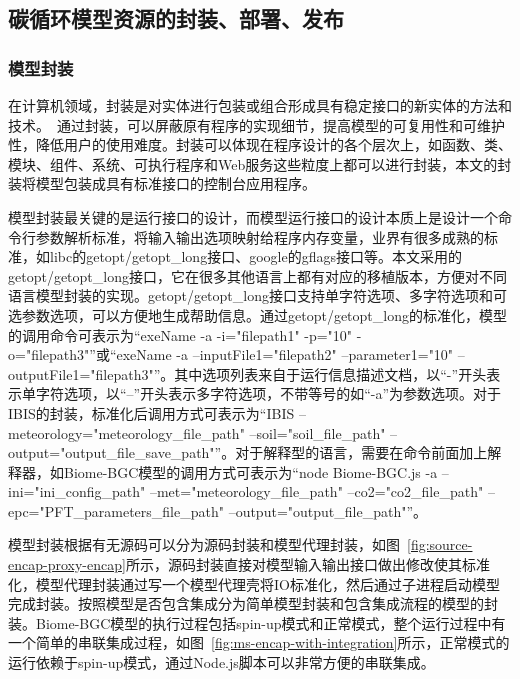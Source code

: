 \subsection{碳循环模型资源的封装、部署、发布}
\label{subsec:ms-encap}
\subsubsection{模型封装}

在计算机领域，封装是对实体进行包装或组合形成具有稳定接口的新实体的方法和技术。~\cite{胡迪2015地理模型的服务化封装方法研究}通过封装，可以屏蔽原有程序的实现细节，提高模型的可复用性和可维护性，降低用户的使用难度。封装可以体现在程序设计的各个层次上，如函数、类、模块、组件、系统、可执行程序和Web服务这些粒度上都可以进行封装，本文的封装将模型包装成具有标准接口的控制台应用程序。

模型封装最关键的是运行接口的设计，而模型运行接口的设计本质上是设计一个命令行参数解析标准，将输入输出选项映射给程序内存变量，业界有很多成熟的标准，如libc的getopt/getopt\_long接口、google的gflags接口等。本文采用的getopt/getopt\_long接口，它在很多其他语言上都有对应的移植版本，方便对不同语言模型封装的实现。getopt/getopt\_long接口支持单字符选项、多字符选项和可选参数选项，可以方便地生成帮助信息。通过getopt/getopt\_long的标准化，模型的调用命令可表示为“exeName -a -i="filepath1" -p="10" -o="filepath3"”或“exeName -a --inputFile1="filepath2" --parameter1="10" --outputFile1="filepath3"”。其中选项列表来自于运行信息描述文档，以“-”开头表示单字符选项，以“--”开头表示多字符选项，不带等号的如“-a”为参数选项。对于IBIS的封装，标准化后调用方式可表示为“IBIS --meteorology="meteorology\_file\_path" --soil="soil\_file\_path" --output="output\_file\_save\_path"”。对于解释型的语言，需要在命令前面加上解释器，如Biome-BGC模型的调用方式可表示为“node Biome-BGC.js -a --ini="ini\_config\_path" --met="meteorology\_file\_path" --co2="co2\_file\_path" --epc="PFT\_parameters\_file\_path" --output="output\_file\_path"”。

模型封装根据有无源码可以分为源码封装和模型代理封装，如图~\ref{fig:source-encap-proxy-encap}所示，源码封装直接对模型输入输出接口做出修改使其标准化，模型代理封装通过写一个模型代理壳将IO标准化，然后通过子进程启动模型完成封装。按照模型是否包含集成分为简单模型封装和包含集成流程的模型的封装。Biome-BGC模型的执行过程包括spin-up模式和正常模式，整个运行过程中有一个简单的串联集成过程，如图~\ref{fig:ms-encap-with-integration}所示，正常模式的运行依赖于spin-up模式，通过Node.js脚本可以非常方便的串联集成。

